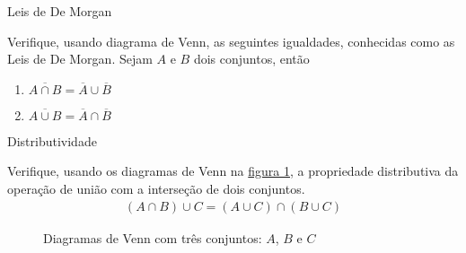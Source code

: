 \begin{task}{Leis de De Morgan}


Verifique, usando diagrama de Venn, as seguintes igualdades, conhecidas como as Leis de De Morgan. Sejam \(A\) e \(B\) dois conjuntos, então
\begin{enumerate}
\item {} 
\(\displaystyle{\overline{A\cap B}}=\overline{A}\cup \overline{B}\)

\item {} 
\(\overline{A\cup B}=\overline{A}\cap \overline{B}\)

\end{enumerate}
\end{task}
\begin{task}{Distributividade}


Verifique, usando os diagramas de Venn na \hyperref[diagramavenn3]{figura \ref{diagramavenn3}}, a propriedade distributiva da operação de união com a interseção de dois conjuntos.
\begin{equation*}
\begin{split}(A\cap B)\cup C=(A\cup C)\cap (B\cup C)\end{split}
\end{equation*}

\begin{figure}[H]
\centering
\begin{minipage}{0.35\textwidth}
\centering
{}

\end{minipage}
\begin{minipage}{0.35\textwidth}
\centering
{}

\end{minipage}
\caption{Diagramas de Venn com três conjuntos: \(A\), \(B\)  e \(C\)}
\label{diagramavenn3}
\end{figure}
\end{task}

